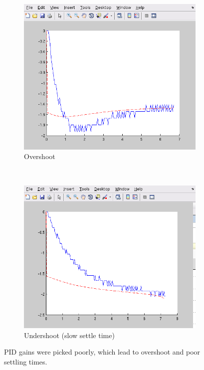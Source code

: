 \documentclass[10pt]{article}
\begin{document}
\begin{enumerate}
\begin{figure}[h]
  \centering
  \begin{subfigure}{0.45\textwidth}
    \includegraphics[width=\textwidth]{images/week-3-pid-overshoot.png}
    \caption{Overshoot}
    \label{fig:pid-overshoot}
  \end{subfigure}
  $\qquad$
  \begin{subfigure}{0.45\textwidth}
    \includegraphics[width=\textwidth]{images/week-3-pid-undershoot.png}
    \caption{Undershoot (slow settle time)}
    \label{fig:pid-undershoot}
  \end{subfigure}
  \caption{PID gains were picked poorly, which lead to overshoot and poor settling times.}
  \label{fig:screens}
\end{figure}


\end{enumerate}
\end{document}

